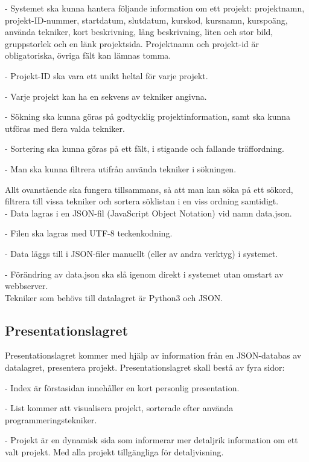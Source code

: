 \documentclass{mall}
\begin{document}
- Systemet ska kunna hantera följande information om ett projekt: projektnamn, projekt-ID-nummer, startdatum, slutdatum, kurskod, kursnamn, kurspoäng, använda tekniker, kort beskrivning, lång beskrivning, liten och stor bild, gruppstorlek och en länk projektsida. Projektnamn och projekt-id är obligatoriska, övriga fält kan lämnas tomma.

- Projekt-ID ska vara ett unikt heltal för varje projekt.

- Varje projekt kan ha en sekvens av tekniker angivna.

- Sökning ska kunna göras på godtycklig projektinformation, samt ska kunna utföras med flera valda tekniker.

- Sortering ska kunna göras på ett fält, i stigande och fallande träffordning.

- Man ska kunna filtrera utifrån använda tekniker i sökningen.

{Allt ovanstående ska fungera tillsammans, så att man kan söka på ett sökord, filtrera till vissa tekniker och sortera söklistan i en viss ordning samtidigt.}
\\

- Data lagras i en JSON-fil (JavaScript Object Notation) vid namn data.json.

- Filen ska lagras med UTF-8 teckenkodning.

- Data läggs till i JSON-filer manuellt (eller av andra verktyg) i systemet.

- Förändring av data.json ska slå igenom direkt i systemet utan omstart av webbserver.
\\

Tekniker som behövs till datalagret är Python3 och JSON.

\subsection*{Presentationslagret}

 Presentationslagret kommer med hjälp av information från en JSON-databas av datalagret, presentera projekt.
Presentationslagret skall bestå av fyra sidor:

- Index är förstasidan innehåller en kort personlig presentation.

- List kommer att visualisera projekt, sorterade efter använda programmeringstekniker.

- Projekt är en dynamisk sida som informerar mer detaljrik information om ett valt projekt. Med alla projekt tillgängliga för detaljvisning.
\end{document}
